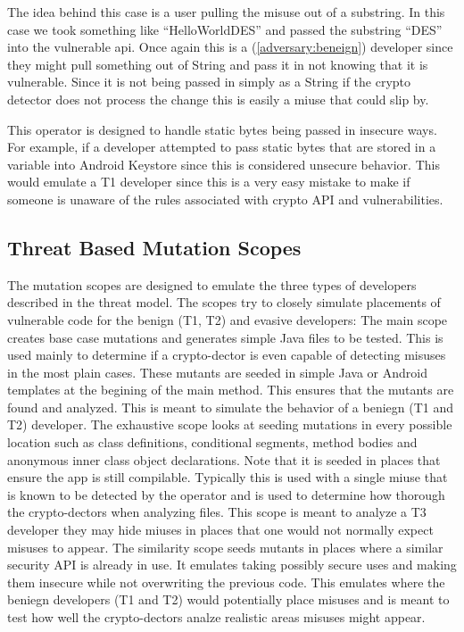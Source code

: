 The idea behind this case is a user pulling the misuse out of a substring. In this case we took something like “HelloWorldDES” and passed the substring “DES” into the vulnerable api. Once again this is a (\ref{adversary:beneign}) developer since they might pull something out of String and pass it in not knowing that it is vulnerable. Since it is not being passed in simply as a String if the crypto detector does not process the change this is easily a miuse that could slip by.

 This operator is designed to handle static bytes being passed in insecure ways. For example, if a developer attempted to pass static bytes that are stored in a variable into Android Keystore since this is considered unsecure behavior. This would emulate a T1 developer since this is a very easy mistake to make if someone is unaware of the rules associated with crypto API and vulnerabilities.



\subsection{Threat Based Mutation Scopes}
\label{ch2:sec:scopes}

The mutation scopes are designed to emulate the three types of developers described in the threat model. The scopes try to closely simulate placements of vulnerable code for the benign (T1, T2) and evasive developers:
The main scope creates base case mutations and generates simple Java files to be tested. This is used mainly to determine if a crypto-dector is even capable of detecting misuses in the most plain cases. These mutants are seeded in simple Java or Android templates at the begining of the main method. This ensures that the mutants are found and analyzed. This is meant to simulate the behavior of a beniegn (T1 and T2) developer.
The exhaustive scope looks at seeding mutations in every possible location such as class definitions, conditional segments, method bodies and anonymous inner class object declarations. Note that it is seeded in places that ensure the app is still compilable. Typically this is used with a single miuse that is known to be detected by the operator and is used to determine how thorough the crypto-dectors when analyzing files. This scope is meant to analyze a T3 developer they may hide miuses in places that one would not normally expect misuses to appear.
The similarity scope seeds mutants in places where a similar security API is already in use. It emulates taking possibly secure uses and making them insecure while not overwriting the previous code. This emulates where the beniegn developers (T1 and T2) would potentially place misuses and is meant to test how well the crypto-dectors analze realistic areas misuses might appear. 

